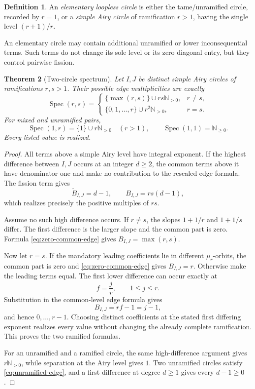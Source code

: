 \documentclass[11pt,a4paper]{amsart}
\theoremstyle{plain}
\newtheorem{theorem}{Theorem}[section]
\theoremstyle{definition}
\newtheorem{definition}[theorem]{Definition}
\newcommand{\NN}{\mathbb N}
\newcommand{\Spec}{\operatorname{Spec}}
\begin{document}
\begin{definition}
An \emph{elementary loopless circle} is either the tame/unramified circle, recorded by $r=1$, or a
\emph{simple Airy circle} of ramification $r>1$, having the single level $(r+1)/r$.
\end{definition}

An elementary circle may contain additional unramified or lower inconsequential terms.  Such terms
do not change its sole level or its zero diagonal entry, but they control pairwise fission.

\begin{theorem}[Two-circle spectrum]\label{thm:pair-spectrum}
Let $I,J$ be distinct simple Airy circles of ramifications $r,s>1$.  Their possible edge
multiplicities are exactly
\[
 \Spec(r,s)=
 \begin{cases}
 \{\max(r,s)\}\cup rs\NN_{>0},&r\ne s,\\[2mm]
 \{0,1,\ldots,r\}\cup r^2\NN_{>0},&r=s.
 \end{cases}
\]
For mixed and unramified pairs,
\[
 \Spec(1,r)=\{1\}\cup r\NN_{>0}\quad(r>1),
 \qquad \Spec(1,1)=\NN_{\ge0}.
\]
Every listed value is realized.
\end{theorem}

\begin{proof}
All terms above a simple Airy level have integral exponent.  If the highest difference between
$I,J$ occurs at an integer $d\ge2$, the common terms above it have denominator one and make no
contribution to the rescaled edge formula.  The fission term gives
\[
 \widetilde B_{I,J}=d-1,
 \qquad B_{I,J}=rs(d-1),
\]
which realizes precisely the positive multiples of $rs$.

Assume no such high difference occurs.  If $r\ne s$, the slopes $1+1/r$ and $1+1/s$ differ.
The first difference is the larger slope and the common part is zero.  Formula
\eqref{eq:zero-common-edge} gives $B_{I,J}=\max(r,s)$.

Now let $r=s$.  If the mandatory leading coefficients lie in different $\mu_r$-orbits, the common
part is zero and \eqref{eq:zero-common-edge} gives $B_{I,J}=r$.  Otherwise make the leading terms
equal.  The first lower difference can occur exactly at
\[
 f=\frac jr,\qquad 1\le j\le r.
\]
Substitution in the common-level edge formula gives
\[
 B_{I,J}=rf-1=j-1,
\]
and hence $0,\ldots,r-1$.  Choosing distinct coefficients at the stated first differing exponent
realizes every value without changing the already complete ramification.  This proves the two
ramified formulas.

For an unramified and a ramified circle, the same high-difference argument gives $r\NN_{>0}$, while
separation at the Airy level gives $1$.  Two unramified circles satisfy
\eqref{eq:unramified-edge}, and a first difference at degree $d\ge1$ gives every $d-1\ge0$.
\end{proof}
\end{document}
